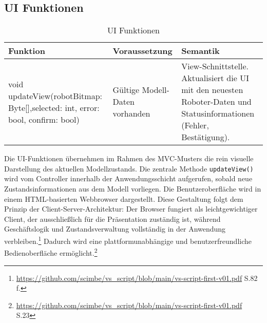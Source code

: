 \clearpage
\subsection{UI Funktionen}
\begin{table}[h!]
    \centering
    \begin{tabular}{|p{5cm}|p{5cm}|p{5cm}|}
        \hline
        \textbf{Funktion} & \textbf{Voraussetzung} & \textbf{Semantik} \\
        \hline
        void updateView(robotBitmap: Byte[],selected: int, error: bool, confirm: bool) & Gültige Modell-Daten vorhanden & View-Schnittstelle. Aktualisiert die UI mit den neuesten Roboter-Daten und Statusinformationen (Fehler, Bestätigung). \\ 
        \hline

    \end{tabular}
    \caption{UI Funktionen}
    \label{tab:UIFunktionen}
\end{table}

Die UI-Funktionen übernehmen im Rahmen des MVC-Musters die rein visuelle Darstellung des aktuellen Modellzustands. 
Die zentrale Methode \texttt{updateView()} wird vom Controller innerhalb der Anwendungsschicht aufgerufen, sobald neue Zustandsinformationen aus dem Modell vorliegen.
Die Benutzeroberfläche wird in einem HTML-basierten Webbrowser dargestellt. 
Diese Gestaltung folgt dem Prinzip der Client-Server-Architektur: Der Browser fungiert als leichtgewichtiger Client, der ausschließlich für die Präsentation zuständig ist, während Geschäftslogik und Zustandsverwaltung vollständig in der Anwendung verbleiben.\footnote{\url{https://github.com/scimbe/vs_script/blob/main/vs-script-first-v01.pdf} S.82 f.} 
Dadurch wird eine plattformunabhängige und benutzerfreundliche Bedienoberfläche ermöglicht.\footnote{\url{https://github.com/scimbe/vs_script/blob/main/vs-script-first-v01.pdf} S.23}
